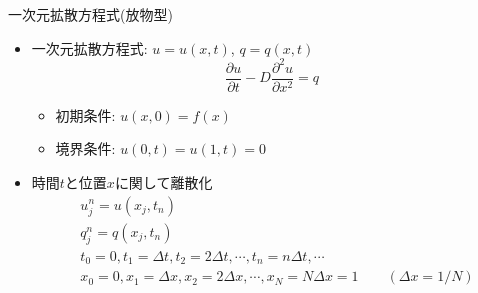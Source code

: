 \begin{frame}[t]{一次元拡散方程式(放物型)}
  \begin{itemize}
  \item 一次元拡散方程式: $u=u(x,t)$, $q=q(x,t)$
    \[
    \frac{\partial u}{\partial t} - D \frac{\partial^2 u}{\partial x^2} = q
    \]
    \begin{itemize}
    \item 初期条件: $u(x,0) = f(x)$
    \item 境界条件: $u(0,t) = u(1,t) = 0$
    \end{itemize}
  \item 時間$t$と位置$x$に関して離散化
    \begin{align*}
      & u_j^n = u(x_j, t_n) \\
      & q_j^n = q(x_j, t_n) \\
      & t_0 = 0, t_1=\Delta t, t_2=2 \Delta t, \cdots, t_n=n \Delta t, \cdots \\
      & x_0 = 0, x_1=\Delta x, x_2=2 \Delta x, \cdots, x_N=N \Delta x = 1 \qquad (\Delta x = 1/N)
    \end{align*}
  \end{itemize}
\end{frame}
